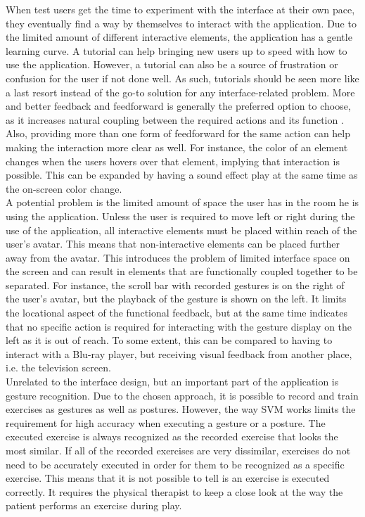 When test users get the time to experiment with the interface at their own pace, they eventually find a way by themselves to interact with the application. Due to the limited amount of different interactive elements, the application has a gentle learning curve. A tutorial can help bringing new users up to speed with how to use the application. However, a tutorial can also be a source of frustration or confusion for the user if not done well. As such, tutorials should be seen more like a last resort instead of the go-to solution for any interface-related problem. More and better feedback and feedforward is generally the preferred option to choose, as it increases natural coupling between the required actions and its function \cite{Wensveen2004}. Also, providing more than one form of feedforward for the same action can help making the interaction more clear as well. For instance, the color of an element changes when the users hovers over that element, implying that interaction is possible. This can be expanded by having a sound effect play at the same time as the on-screen color change.\\

A potential problem is the limited amount of space the user has in the room he is using the application. Unless the user is required to move left or right during the use of the application, all interactive elements must be placed within reach of the user's avatar. This means that non-interactive elements can be placed further away from the avatar. This introduces the problem of limited interface space on the screen and can result in elements that are functionally coupled together to be separated. For instance, the scroll bar with recorded gestures is on the right of the user's avatar, but the playback of the gesture is shown on the left. It limits the locational aspect of the functional feedback, but at the same time indicates that no specific action is required for interacting with the gesture display on the left as it is out of reach. To some extent, this can be compared to having to interact with a Blu-ray player, but receiving visual feedback from another place, i.e. the television screen.\\

Unrelated to the interface design, but an important part of the application is gesture recognition. Due to the chosen approach, it is possible to record and train exercises as gestures as well as postures. However, the way SVM works limits the requirement for high accuracy when executing a gesture or a posture. The executed exercise is always recognized as the recorded exercise that looks the most similar. If all of the recorded exercises are very dissimilar, exercises do not need to be accurately executed in order for them to be recognized as a specific exercise. This means that it is not possible to tell is an exercise is executed correctly. It requires the physical therapist to keep a close look at the way the patient performs an exercise during play.\\

